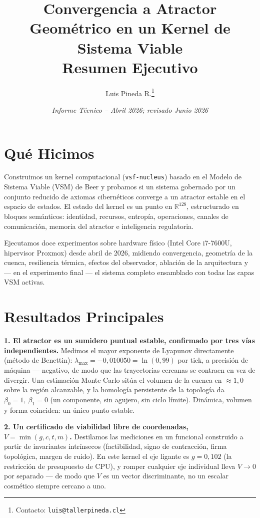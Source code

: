 \documentclass[11pt, a4paper]{article}
\title{%
  \textbf{Convergencia a Atractor Geométrico en un Kernel de Sistema Viable}\\[4pt]
  \large Resumen Ejecutivo
}
\author{Luis Pineda R.\thanks{Contacto: \texttt{luis@tallerpineda.cl}}}
\date{\textit{Informe Técnico -- Abril 2026; revisado Junio 2026}}
\newcommand{\R}{\mathbb{R}}
\newcommand{\nucleus}{\texttt{vsf-nucleus}}
\begin{document}
\maketitle

\section*{Qué Hicimos}

Construimos un kernel computacional (\nucleus{}) basado en el Modelo de Sistema Viable
(VSM) de Beer y probamos si un sistema gobernado por un conjunto reducido de axiomas
cibernéticos converge a un atractor estable en el espacio de estados. El estado del
kernel es un punto en $\R^{128}$, estructurado en bloques semánticos: identidad,
recursos, entropía, operaciones, canales de comunicación, memoria del atractor e
inteligencia regulatoria.

Ejecutamos doce experimentos sobre hardware físico (Intel Core i7-7600U, hipervisor
Proxmox) desde abril de 2026, midiendo convergencia, geometría de la cuenca,
resiliencia térmica, efectos del observador, ablación de la arquitectura y --- en el
experimento final --- el sistema completo ensamblado con todas las capas VSM activas.

\section*{Resultados Principales}

\textbf{1. El atractor es un sumidero puntual estable, confirmado por tres vías
independientes.} Medimos el mayor exponente de Lyapunov directamente (método de
Benettin): $\lambda_\text{max} = -0{,}010050 = \ln(0{,}99)$ por tick, a precisión de
máquina --- negativo, de modo que las trayectorias cercanas se contraen en vez de
divergir. Una estimación Monte-Carlo sitúa el volumen de la cuenca en $\approx 1{,}0$
sobre la región alcanzable, y la homología persistente de la topología da
$\beta_0 = 1,\ \beta_1 = 0$ (un componente, sin agujero, sin ciclo límite). Dinámica,
volumen y forma coinciden: un único punto estable.

\textbf{2. Un certificado de viabilidad libre de coordenadas, $V = \min(g, c, t, m)$.}
Destilamos las mediciones en un funcional construido a partir de invariantes
intrínsecos (factibilidad, signo de contracción, firma topológica, margen de ruido).
En este kernel el eje ligante es $g = 0{,}102$ (la restricción de presupuesto de CPU),
y romper cualquier eje individual lleva $V \to 0$ por separado --- de modo que $V$ es
un vector discriminante, no un escalar cosmético siempre cercano a uno.
\end{document}
